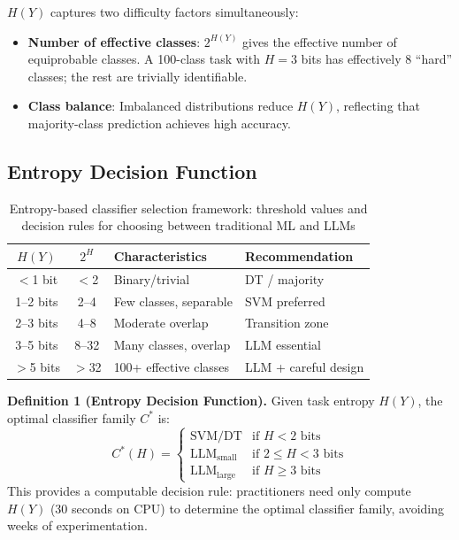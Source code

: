 \documentclass[review,3p]{elsarticle}
\begin{document}
$H(Y)$ captures two difficulty factors simultaneously:
\begin{itemize}
\item \textbf{Number of effective classes}: $2^{H(Y)}$ gives the effective number of equiprobable classes. A 100-class task with $H = 3$ bits has effectively 8 ``hard'' classes; the rest are trivially identifiable.
\item \textbf{Class balance}: Imbalanced distributions reduce $H(Y)$, reflecting that majority-class prediction achieves high accuracy.
\end{itemize}

\subsection{Entropy Decision Function}

\begin{table}[!ht]
\centering
\caption{Entropy-based classifier selection framework: threshold values and decision rules for choosing between traditional ML and LLMs}
\label{tab:framework}
\begin{tabular}{ccll}
\toprule
\textbf{$H(Y)$} & \textbf{$2^{H}$} & \textbf{Characteristics} & \textbf{Recommendation} \\
\midrule
$<$1 bit & $<$2 & Binary/trivial & DT / majority \\
1--2 bits & 2--4 & Few classes, separable & SVM preferred \\
2--3 bits & 4--8 & Moderate overlap & Transition zone \\
3--5 bits & 8--32 & Many classes, overlap & LLM essential \\
$>$5 bits & $>$32 & 100+ effective classes & LLM + careful design \\
\bottomrule
\end{tabular}
\end{table}

\noindent\textbf{Definition 1 (Entropy Decision Function).} Given task entropy $H(Y)$, the optimal classifier family $C^*$ is:
\begin{equation}
C^*(H) = \begin{cases}
\text{SVM/DT} & \text{if } H < 2 \text{ bits} \\
\text{LLM}_{\text{small}} & \text{if } 2 \leq H < 3 \text{ bits} \\
\text{LLM}_{\text{large}} & \text{if } H \geq 3 \text{ bits}
\end{cases}
\end{equation}
This provides a computable decision rule: practitioners need only compute $H(Y)$ (30 seconds on CPU) to determine the optimal classifier family, avoiding weeks of experimentation.
\end{document}
